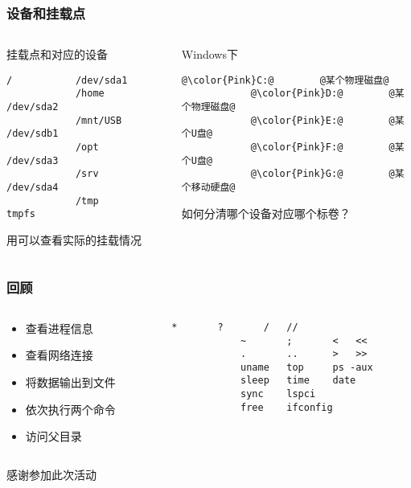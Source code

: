 \begin{CJK}{UTF8}{gbsn}
\begin{frame} [fragile]
	\frametitle{设备和挂载点}
	\linespread{1.5}
	\begin{columns}[T]
		\begin{column}[T]{.5\textwidth}
			挂载点和对应的设备
			\begin{lstlisting}[style=bashstyle, gobble=12, texcl, escapechar=@]
			/			/dev/sda1
			/home		/dev/sda2
			/mnt/USB	/dev/sdb1
			/opt		/dev/sda3
			/srv		/dev/sda4
			/tmp		tmpfs
			\end{lstlisting}
			用可以查看实际的挂载情况
		\end{column}
		\begin{column}[T]{.5\textwidth}
			Windows下
			\begin{lstlisting}[style=bashstyle, gobble=12, texcl, escapechar=@]
			@\color{Pink}C:@		@某个物理磁盘@
			@\color{Pink}D:@		@某个物理磁盘@
			@\color{Pink}E:@		@某个U盘@
			@\color{Pink}F:@		@某个U盘@
			@\color{Pink}G:@		@某个移动硬盘@
			\end{lstlisting}
			如何分清哪个设备对应哪个标卷？
		\end{column}
	\end{columns}
\end{frame}

\begin{frame} [fragile]
	\frametitle{回顾}
	\linespread{1.5}
	\begin{columns}[T]
		\begin{column}[T]{.5\textwidth}
			\begin{itemize}
			\item 查看进程信息
			\item 查看网络连接
			\item 将数据输出到文件
			\item 依次执行两个命令
			\item 访问父目录
			\end{itemize}
		\end{column}
		\begin{column}[T]{.5\textwidth}
			\begin{lstlisting}[style=bashstyle, gobble=12, texcl, escapechar=@]
			*		?		/	//
			~		;		<	<<
			.		..		>	>>
			uname	top		ps -aux
			sleep	time	date
			sync	lspci
			free	ifconfig	
			\end{lstlisting}
		\end{column}
	\end{columns}
\end{frame}

\PreLastFrame
\begin{frame}
	\centerline{\fontsize{32}{32}\selectfont 感谢参加此次活动}
\end{frame}

\newpage
\end{CJK}


